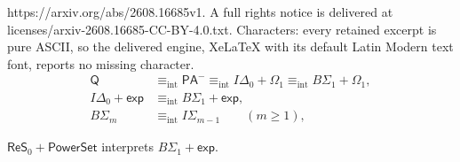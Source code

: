 \documentclass[10pt,a4paper]{amsart}
\newcommand{\BS}[1]{B\Sigma_{#1}}
\newcommand{\IDelta}{I\Delta_{0}}
\newcommand{\Mint}{\mathrel{\equiv_{\mathrm{int}}}}
\newcommand{\OmegaOne}{\Omega_{1}}
\newcommand{\PAminus}{\mathsf{PA}^{-}}
\newcommand{\Pow}{\mathsf{PowerSet}}
\newcommand{\Q}{\mathsf Q}
\newcommand{\ReSzero}{\mathsf{ReS}_{0}}
\newcommand{\expax}{\mathsf{exp}}
\begin{document}
https://arxiv.org/abs/2608.16685v1. A full rights notice is delivered at licenses/arxiv-2608.16685-CC-BY-4.0.txt. Characters: every retained excerpt is pure ASCII, so the delivered engine, XeLaTeX with its default Latin Modern text font, reports no missing character.
\begin{align}
\Q&\Mint\PAminus
\Mint\IDelta+\OmegaOne
\Mint\BS1+\OmegaOne,                                      \label{eq:q-spine}\\
\IDelta+\expax&\Mint\BS1+\expax,                         \label{eq:exp-spine}\\
\BS{m}&\Mint I\Sigma_{m-1}\qquad(m\geq1),                \label{eq:ind-spine}
\end{align}

\begin{theorem}
  \(\ReSzero+\Pow\) interprets \(\BS1+\expax\).
\end{theorem}
\end{document}
